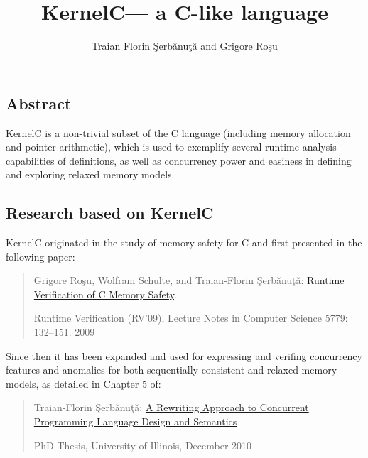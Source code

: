 \newcommand{\KERNELC}{{\sc KernelC}\xspace}
\setlength{\parindent}{1em}
\title{\KERNELC --- a C-like language}
\author{Traian Florin \c{S}erb\u{a}nu\c{t}\u{a} and Grigore Ro\c{s}u}

\maketitle

\begin{latexComment}
\section{Abstract}
\KERNELC is a non-trivial subset of the C language (including memory allocation and pointer arithmetic), which is used to exemplify several runtime analysis capabilities of \K definitions, as well as concurrency power and easiness in defining and exploring relaxed memory models.


\subsection{Research based on \KERNELC}
\KERNELC originated in the study of memory safety for C and first presented in the following paper:
\begin{quote}
Grigore Ro\c su, Wolfram Schulte, and Traian-Florin \c Serb\u anu\c t\u a:
\href{http://dx.doi.org/10.1007/978-3-642-04694-0_10}{Runtime Verification of C Memory Safety}.

Runtime Verification (RV'09), Lecture Notes in Computer Science 5779: 132--151. 2009
\end{quote}

Since then it has been expanded and used for expressing and verifing concurrency features and anomalies for both sequentially-consistent and relaxed memory models, as detailed in Chapter 5 of:

\begin{quote}
  Traian-Florin \c Serb\u anu\c t\u a: \href{https://www.ideals.illinois.edu/handle/2142/18252}{A Rewriting Approach to Concurrent Programming Language Design and Semantics}

  PhD Thesis, University of Illinois, December 2010
\end{quote}

\end{latexComment}

\vspace*{3ex}
